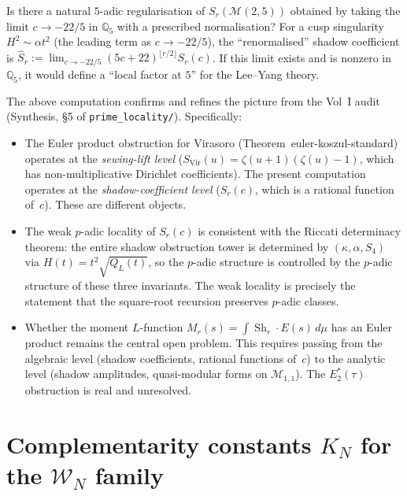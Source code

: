 \documentclass[11pt]{article}
\newcommand{\cM}{\mathcal{M}}
\newcommand{\cW}{\mathcal{W}}
\newcommand{\Q}{\mathbb{Q}}
\begin{document}
\begin{question}
\label{q:yang-lee-5-adic}
Is there a natural $5$-adic regularisation of $S_r(\cM(2,5))$
obtained by taking the limit $c \to -22/5$ in $\Q_5$ with a
prescribed normalisation?  For a cusp singularity $H^2 \sim
\alpha t^2$ (the leading term as $c \to -22/5$), the
``renormalised'' shadow coefficient is
$\hat{S}_r := \lim_{c \to -22/5} (5c+22)^{\lfloor r/2
\rfloor} S_r(c)$.  If this limit exists and is nonzero in
$\Q_5$, it would define a ``local factor at $5$'' for the
Lee--Yang theory.
\end{question}

\begin{remark}
The above computation confirms and refines the picture from the
Vol~I audit (Synthesis, \S5 of \texttt{prime\_locality/}).
Specifically:
\begin{itemize}[leftmargin=1.8em]
\item The Euler product obstruction for Virasoro
  (Theorem~\textup{euler-koszul-standard}) operates at the
  \emph{sewing-lift level} ($S_{\mathrm{Vir}}(u) = \zeta(u+1)
  (\zeta(u) - 1)$, which has non-multiplicative Dirichlet
  coefficients).  The present computation operates at the
  \emph{shadow-coefficient level} ($S_r(c)$, which is a
  rational function of~$c$).  These are different objects.

\item The weak $p$-adic locality of $S_r(c)$ is consistent with
  the Riccati determinacy theorem: the entire shadow obstruction tower is
  determined by $(\kappa, \alpha, S_4)$ via
  $H(t) = t^2\sqrt{Q_L(t)}$, so the $p$-adic structure is
  controlled by the $p$-adic structure of these three
  invariants.  The weak locality is precisely the statement that
  the square-root recursion preserves $p$-adic classes.

\item Whether the moment $L$-function $M_r(s) = \int
  \operatorname{Sh}_r \cdot E(s)\,d\mu$ has an Euler product
  remains the central open problem.  This requires passing from
  the algebraic level (shadow coefficients, rational functions
  of~$c$) to the analytic level (shadow amplitudes, quasi-modular
  forms on $\cM_{1,1}$).  The $E_2^*(\tau)$ obstruction is real
  and unresolved.
\end{itemize}
\end{remark}


\section{Complementarity constants $K_N$ for the $\cW_N$ family}
\label{sec:wn-complementarity-constants}
\end{document}
